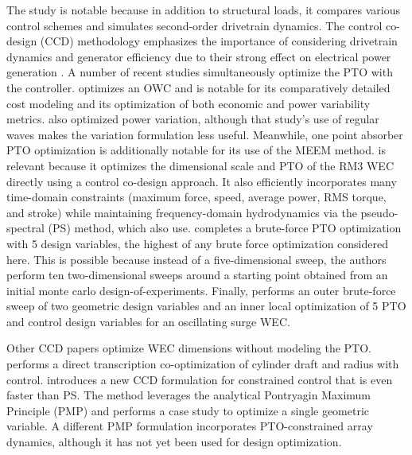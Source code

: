 The study \cite{ferri_balancing_2014} is notable because in addition to structural loads, it compares various control schemes and simulates second-order drivetrain dynamics. The control co-design (CCD) methodology \cite{garcia-sanz_control_2019} emphasizes the importance of considering drivetrain dynamics and generator efficiency due to their strong effect on electrical power generation \cite{coe_useful_2023}. A number of recent studies \cite{rosati_control_2023,son_performance_2016,anderson_re-imagining_2024,devin_high-dimensional_2024,grasberger_control_2024} simultaneously optimize the PTO with the controller. \cite{rosati_control_2023} optimizes an OWC and is notable for its comparatively detailed cost modeling and its optimization of both economic and power variability metrics. \cite{mccabe_multidisciplinary_2022} also optimized power variation, although that study's use of regular waves makes the variation formulation less useful. Meanwhile, one point absorber PTO optimization \cite{son_performance_2016} is additionally notable for its use of the MEEM method. \cite{gaebele_tpl_2025} is relevant because it optimizes the dimensional scale and PTO of the RM3 WEC directly using a control co-design approach. It also efficiently incorporates many time-domain constraints (maximum force, speed, average power, RMS torque, and stroke) while maintaining frequency-domain hydrodynamics via the pseudo-spectral (PS) method, which \cite{devin_high-dimensional_2024,grasberger_control_2024} also use. \cite{devin_high-dimensional_2024} completes a brute-force PTO optimization with 5 design variables, the highest of any brute force optimization considered here. This is possible because instead of a five-dimensional sweep, the authors perform ten two-dimensional sweeps around a starting point obtained from an initial monte carlo design-of-experiments. Finally, \cite{grasberger_control_2024} performs an outer brute-force sweep of two geometric design variables and an inner local optimization of 5 PTO and control design variables for an oscillating surge WEC. 

Other CCD papers optimize WEC dimensions without modeling the PTO. \cite{herber_dynamic_2014} performs a direct transcription co-optimization of cylinder draft and radius with control. \cite{lin_fast_2025} introduces a new CCD formulation for constrained control that is even faster than PS. The method leverages the analytical Pontryagin Maximum Principle (PMP) and performs a case study to optimize a single geometric variable. A different PMP formulation \cite{abdulkadir_optimal_2024} incorporates PTO-constrained array dynamics, although it has not yet been used for design optimization. 

